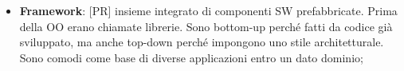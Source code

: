 \begin{itemize}
		\item \textbf{Framework}: [PR] insieme integrato di componenti SW prefabbricate. Prima della OO erano chiamate librerie. Sono bottom-up perché fatti da codice già sviluppato, ma anche top-down perché impongono uno stile architetturale. Sono comodi come base di diverse applicazioni entro un dato dominio;

	\end{itemize}